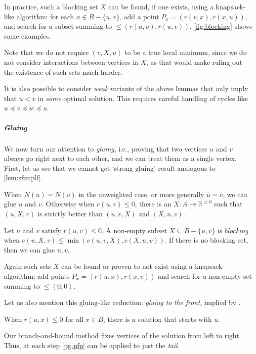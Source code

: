\documentclass[a4paper,UKenglish,cleveref, autoref, thm-restate]{lipics-v2021}
\newcommand{\be}{\preceq}
\begin{document}
In practice, such a blocking set $X$ can be found, if one exists, using a knapsack-like algorithm: for
each $x\in B-\{u,v\}$, add a point $P_x = (r(v, x), r(x, u))$, and search for a subset summing
to ${\leq{}(r(u, v), r(u, v))}$. \cref{fig:blocking} shows some examples.

Note that we do not require $(v, X, u)$ to be a true local minimum, since we do
not consider interactions between vertices in $X$, as that would make ruling out the
existence of such sets much harder.

\begin{remark}
  It is also possible to consider \emph{weak} variants of the above lemmas that
  only imply that $u < v$ in \emph{some} optimal solution. This requires careful
  handling of cycles like $u\be v\be w\be u$.
\end{remark}

\subparagraph{Gluing}
We now turn our attention to \emph{gluing}, i.e., proving that two vertices $u$
and $v$ always go right next to each other, and we can treat them as a single vertex. First,
let us see that we cannot get `strong gluing' result analogous to \cref{lem:sfimplf}.

\begin{remark}
  When $N(u)=N(v)$ in the unweighted case, or more generally $\bar u=\bar v$, we can glue $u$
    and $v$.
  Otherwise when $r(u,v)\leq 0$, there is an $X : A\to \mathbb R^{\geq 0}$ such that $(u, X, v)$ is
  strictly better than $(u,v,X)$ and $(X,u,v)$.
\end{remark}
\begin{lemma}\label{pg}
    Let $u$ and $v$ satisfy $r(u, v) \leq 0$.
    A non-empty subset $X\subseteq B-\{u,v\}$ is \emph{blocking} when $c(u, X, v) \leq
    \min(c(u, v, X), c(X, u, v))$. If there is no blocking set, then we can glue $u, v$.
\end{lemma}
Again such sets $X$ can be found or proven to not exist using a knapsack
algorithm: add points $P_x = (r(u, x), r(x, v))$ and search for a non-empty
set summing to $\leq{}(0,0)$.

Let us also mention this gluing-like reduction: \emph{gluing to the front}, implied by
\cite[RRL01]{dujmovic_2008}.
\begin{lemma}[Greedy]\label{greedy}
  \!\!When $r(u, x)\leq 0$ for all $x\in B$, there is a solution that
  starts with $u$.\!\!
\end{lemma}

\begin{remark}
  Our branch-and-bound method fixes vertices of the
solution from left to right. Thus, at each step \cref{pg,pfp} can be applied to
just the \emph{tail}.
\end{remark}
\end{document}
